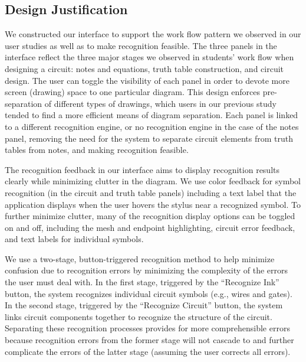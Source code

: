 \documentclass{elsart}
\begin{document}
\subsection{Design Justification}

We constructed our interface to support the work flow pattern we
observed in our user studies as well as to make recognition feasible.
The three panels in the interface reflect the three major stages we
observed in students' work flow when designing a circuit: notes and
equations, truth table construction, and circuit
design.  The user can toggle the visibility of each panel in order to
devote more screen (drawing) space to one particular diagram.  This
design enforces pre-separation of different types of drawings, which
users in our previous study tended to find a more efficient means of
diagram separation.  Each panel is linked to a different recognition
engine, or no recognition engine in the case of the notes panel,
removing the need for the system to separate circuit elements
from truth tables from notes, and making recognition feasible.

The recognition feedback in our interface aims to display recognition
results clearly while minimizing clutter in the diagram.  We use color
feedback for symbol recognition (in the circuit and truth table
panels) including a text label that the application displays when the
user hovers the stylus near a recognized symbol.  To further minimize
clutter, many of the recognition display options can be toggled on and
off, including the mesh and endpoint highlighting, circuit error
feedback, and text labels for individual symbols.


We use a two-stage, button-triggered recognition method to help
minimize confusion due to recognition errors by minimizing the
complexity of the errors the user must deal with.  In the first stage,
triggered by the ``Recognize Ink'' button, the system recognizes
individual circuit symbols (e.g., wires and gates).  In the second
stage, triggered by the ``Recognize Circuit'' button, the system links
circuit components together to recognize the structure of the circuit.
Separating these recognition processes provides for more
comprehensible errors because recognition errors from the former stage
will not cascade to and further complicate the errors of the latter
stage (assuming the user corrects all errors).  
\end{document}

